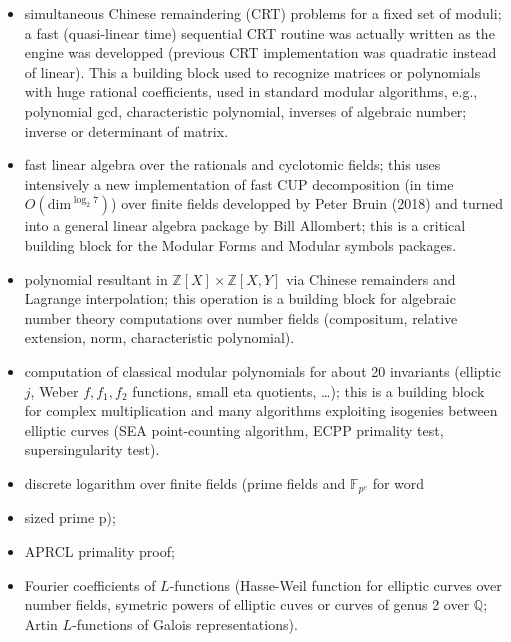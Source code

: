 \documentclass{deliverablereport}
\begin{document}
\begin{itemize}
\item simultaneous Chinese remaindering (CRT) problems for a fixed set of
  moduli; a fast (quasi-linear time) sequential CRT routine was actually
  written as the engine was developped (previous CRT implementation was
  quadratic instead of linear). This a building block used to recognize
  matrices or polynomials with huge rational coefficients, used in standard
  modular algorithms, e.g., polynomial gcd, characteristic polynomial,
  inverses of algebraic number; inverse or determinant of matrix.

\item fast linear algebra over the rationals and cyclotomic fields; this 
  uses intensively a new implementation of fast CUP decomposition (in time
  $O(\text{dim}^{\log_2 7})$) over finite fields developped by Peter Bruin
  (2018) and turned into a general linear algebra package by Bill Allombert;
  this is a critical building block for the Modular Forms and Modular symbols
  packages.

\item polynomial resultant in $\mathbb{Z}[X] \times \mathbb{Z}[X,Y]$
  via Chinese remainders and Lagrange interpolation; this operation is a
  building block for algebraic number theory computations over number
  fields (compositum, relative extension, norm, characteristic polynomial).

\item computation of classical modular polynomials for about 20 invariants
  (elliptic $j$, Weber $f,f_1,f_2$ functions, small eta quotients, \dots);
    this is a building block for complex multiplication and many algorithms
    exploiting isogenies between elliptic curves (SEA point-counting
    algorithm, ECPP primality test, supersingularity test).

\item discrete logarithm over finite fields (prime fields and
  $\mathbb{F}_{p^e}$ for word\item sized prime p);

\item APRCL primality proof;

\item Fourier coefficients of $L$-functions (Hasse-Weil function for
  elliptic curves over number fields, symetric powers of elliptic cuves or
  curves of genus 2 over $\mathbb{Q}$; Artin $L$-functions of Galois
  representations).
\end{itemize}
\end{document}
